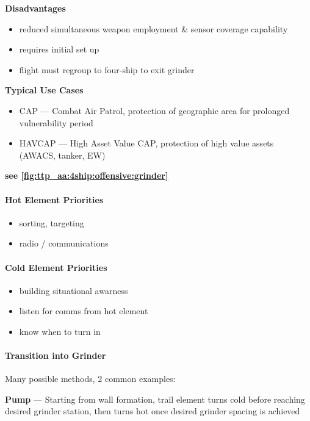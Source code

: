 \textbf{Disadvantages}
\begin{itemize}
    \item reduced simultaneous weapon employment \& sensor coverage capability
    \item requires initial set up
    \item flight must regroup to four-ship to exit grinder
\end{itemize}

\textbf{Typical Use Cases} 
\begin{itemize}
    \item CAP --- Combat Air Patrol, protection of geographic area for prolonged vulnerability period
    \item HAVCAP --- High Asset Value CAP, protection of high value assets (AWACS, tanker, EW)
\end{itemize}

\hfill\textbf{see \cref{fig:ttp_aa:4ship:offensive:grinder}}

\paragraph{Hot Element Priorities}
\begin{itemize}
    \item sorting, targeting
    \item radio / communications
\end{itemize}

\paragraph{Cold Element Priorities}
\begin{itemize}
    \item building situational awarness
    \item listen for comms from hot element
    \item know when to turn in
\end{itemize}

\clearpage

\paragraph{Transition into Grinder} Many possible methods, 2 common examples:

\bigskip
\textbf{Pump}
--- Starting from wall formation, trail element turns cold before reaching desired grinder station,
then turns hot once desired grinder spacing is achieved

